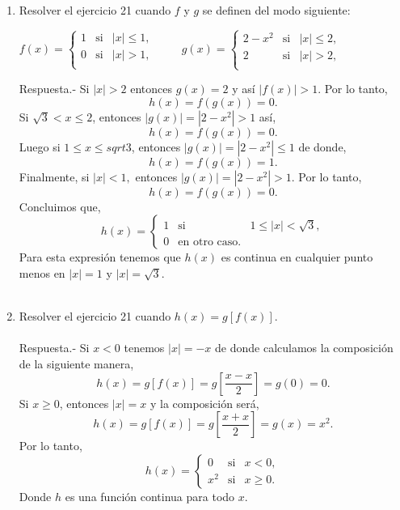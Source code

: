 \begin{enumerate}[\bfseries 1.]
    \item Resolver el ejercicio 21 cuando $f$ y $g$ se definen del modo siguiente:
	\begin{center}
	    $f(x)=\left\{\begin{array}{rcl}
		1&\mbox{si}&|x|\leq 1,\\
		0&\mbox{si}&|x|>1,\\
	    \end{array}\right.$
	    $\qquad g(x)=\left\{\begin{array}{rcl}
		2-x^2&\mbox{si}&|x|\leq 2,\\
		2&\mbox{si}&|x|> 2,\\
	    \end{array}\right.$
	\end{center}

	Respuesta.-\; Si $|x|>2$ entonces $g(x)=2$ y así $|f(x)|>1$. Por lo tanto,
	$$h(x)=f(g(x))=0.$$
	Si $\sqrt{3}<x\leq 2$, entonces $|g(x)|=|2-x^2|>1$ así,
	$$h(x)=f(g(x))=0.$$
	Luego si $1\leq x \leq sqrt{3}$, entonces $|g(x)|=|2-x^2|\leq 1$ de donde,
	$$h(x)=f(g(x))=1.$$
	Finalmente, si $|x|<1,$ entonces $|g(x)|=|2-x^2|>1$. Por lo tanto,
	$$h(x)=f(g(x))=0.$$
	Concluimos que,
	$$h(x)=\left\{\begin{array}{rcl}
		1 & \mbox{si} & 1\leq |x|<\sqrt{3},\\
		0 & \mbox{en otro caso}.
	\end{array}\right.$$
	Para esta expresión tenemos que $h(x)$ es continua en cualquier punto menos en $|x|=1$ y $|x|=\sqrt{3}.$\\\\

    \item Resolver el ejercicio 21 cuando $h(x)=g[f(x)]$.\\\\
	Respuesta.-\; Si $x<0$ tenemos $|x|=-x$ de donde calculamos la composición de la siguiente manera,
	$$h(x)=g[f(x)]=g\left[\dfrac{x-x}{2}\right]=g(0)=0.$$
	Si $x\geq 0$, entonces $|x|=x$ y la composición será,
	$$h(x)=g[f(x)]=g\left[\dfrac{x+x}{2}\right]=g(x)=x^2.$$
	Por lo tanto,
	$$h(x)=\left\{\begin{array}{rcl}
		0&\mbox{si}&x<0,\\
		x^2&\mbox{si}&x\geq 0.
	\end{array}\right.$$
	Donde $h$ es una función continua para todo $x$.\\\\

\end{enumerate}



